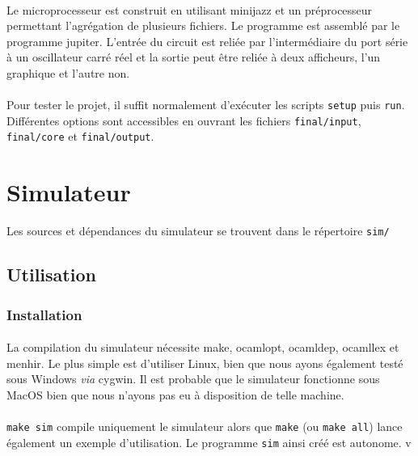 \documentclass{article}
\begin{document}
\paragraph{}Le microprocesseur est construit en utilisant minijazz et un préprocesseur permettant l'agrégation de plusieurs fichiers. Le programme est assemblé par le programme jupiter. L'entrée du circuit est reliée par l'intermédiaire du port série à un oscillateur carré réel et la sortie peut être reliée à deux afficheurs, l'un graphique et l'autre non.

\paragraph{}Pour tester le projet, il suffit normalement d'exécuter les scripts \texttt{setup} puis \texttt{run}. Différentes options sont accessibles en ouvrant les fichiers \texttt{final/input}, \texttt{final/core} et \texttt{final/output}.

\section{Simulateur}

Les sources et dépendances du simulateur se trouvent dans le répertoire \texttt{sim/}


\subsection{Utilisation}
\subsubsection{Installation}
\paragraph{}La compilation du simulateur nécessite make, ocamlopt, ocamldep, ocamllex et menhir. Le plus simple est d'utiliser Linux, bien que nous ayons également testé sous Windows \emph{via} cygwin. Il est probable que le simulateur fonctionne sous MacOS bien que nous n'ayons pas eu à disposition de telle machine.

\paragraph{}\texttt{make sim} compile uniquement le simulateur alors que \texttt{make} (ou \texttt{make all}) lance également un exemple d'utilisation. Le programme \texttt{sim} ainsi créé est autonome.
v
\end{document}

